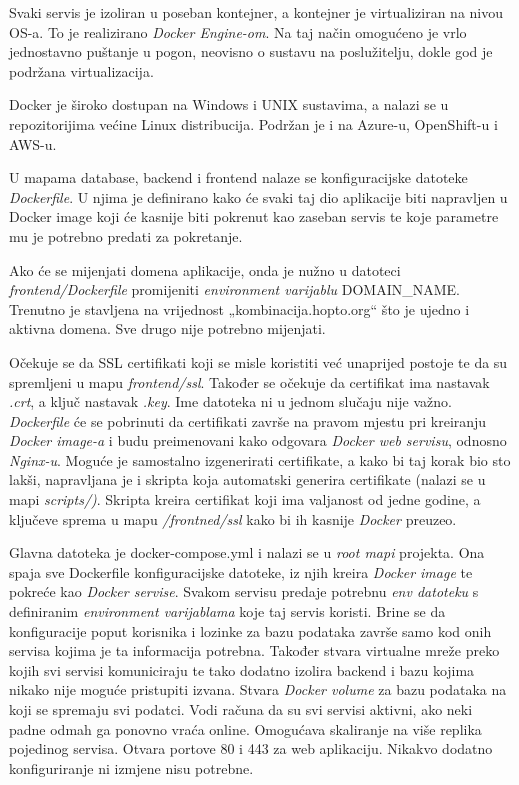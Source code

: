		Svaki servis je izoliran u poseban kontejner, a kontejner je virtualiziran na nivou OS-a. To je realizirano  \textit{Docker Engine-om}. Na taj način omogućeno je vrlo jednostavno puštanje u pogon, neovisno o sustavu na poslužitelju, dokle god je podržana virtualizacija. 

		Docker je široko dostupan na Windows i UNIX sustavima, a nalazi se u repozitorijima većine Linux distribucija. Podržan je i na Azure-u, OpenShift-u i AWS-u.\\
		
		
		
	
		U mapama database, backend i frontend nalaze se konfiguracijske datoteke  \textit{Dockerfile}. U njima je definirano kako će svaki taj dio aplikacije biti napravljen u Docker image koji će kasnije biti pokrenut kao zaseban servis te koje parametre mu je potrebno predati za pokretanje. 
			
			Ako će se mijenjati domena aplikacije, onda je nužno u datoteci  \textit{frontend/Dockerfile} promijeniti  \textit{environment varijablu} DOMAIN\_NAME. Trenutno je stavljena na vrijednost „kombinacija.hopto.org“ što je ujedno i aktivna domena. Sve drugo nije potrebno mijenjati.
			
			
Očekuje se da SSL certifikati koji se misle koristiti već unaprijed postoje te da su spremljeni u mapu \textit{frontend/ssl}. Također se očekuje da certifikat ima nastavak \textit{.crt}, a ključ nastavak \textit{.key}. Ime datoteka ni u jednom slučaju nije važno. \textit{Dockerfile} će se pobrinuti da certifikati završe na pravom mjestu pri kreiranju \textit{Docker image-a} i budu preimenovani kako odgovara \textit{Docker web servisu}, odnosno \textit{Nginx-u}. Moguće je samostalno izgenerirati certifikate, a kako bi taj korak bio sto lakši, napravljana je i skripta koja automatski generira certifikate (nalazi se u mapi \textit{scripts/)}. Skripta kreira certifikat koji ima valjanost od jedne godine, a ključeve sprema u mapu \textit{/frontned/ssl} kako bi ih kasnije \textit{Docker} preuzeo.
			
    			Glavna datoteka je docker-compose.yml i nalazi se u  \textit{root mapi} projekta. Ona spaja sve Dockerfile konfiguracijske datoteke, iz njih kreira  \textit{Docker image} te pokreće kao  \textit{Docker servise}. Svakom servisu predaje potrebnu  \textit{env datoteku} s definiranim  \textit{environment varijablama} koje taj servis koristi. Brine se da konfiguracije poput korisnika i lozinke za bazu podataka završe samo kod onih servisa kojima je ta informacija potrebna. Također stvara virtualne mreže preko kojih svi servisi komuniciraju te tako dodatno izolira backend i bazu kojima nikako nije moguće pristupiti izvana. Stvara  \textit{Docker volume} za bazu podataka na koji se spremaju svi podatci. Vodi računa da su svi servisi aktivni, ako neki padne odmah ga ponovno vraća online. Omogućava skaliranje na više replika pojedinog servisa. Otvara portove 80 i 443 za web aplikaciju. Nikakvo dodatno konfiguriranje ni izmjene nisu potrebne.
	
